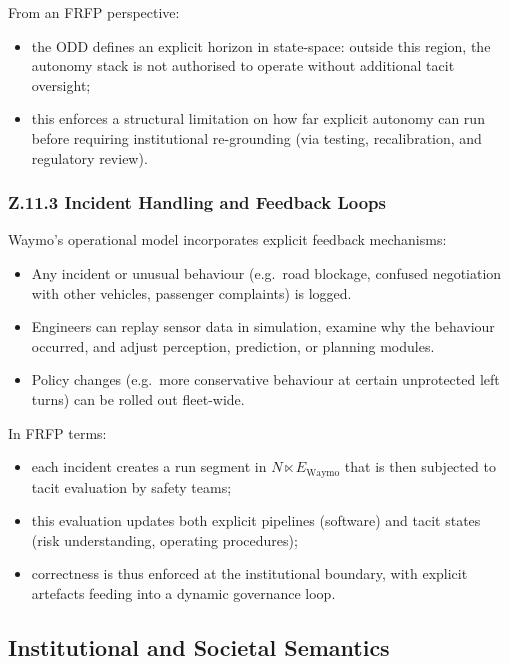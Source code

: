 From an FRFP perspective:

\begin{itemize}
  \item the ODD defines an explicit horizon in state-space:
        outside this region, the autonomy stack is not authorised to
        operate without additional tacit oversight;
  \item this enforces a structural limitation on how far explicit autonomy
        can run before requiring institutional re-grounding (via testing,
        recalibration, and regulatory review).
\end{itemize}

\subsubsection*{Z.11.3 Incident Handling and Feedback Loops}

Waymo’s operational model incorporates explicit feedback mechanisms:

\begin{itemize}
  \item Any incident or unusual behaviour (e.g.\ road blockage, confused
        negotiation with other vehicles, passenger complaints) is logged.
  \item Engineers can replay sensor data in simulation, examine why the
        behaviour occurred, and adjust perception, prediction, or planning
        modules.
  \item Policy changes (e.g.\ more conservative behaviour at certain
        unprotected left turns) can be rolled out fleet-wide.
\end{itemize}

In FRFP terms:

\begin{itemize}
  \item each incident creates a run segment in \(N \ltimes E_{\mathrm{Waymo}}\)
        that is then subjected to tacit evaluation by safety teams;
  \item this evaluation updates both explicit pipelines (software) and
        tacit states (risk understanding, operating procedures);
  \item correctness is thus enforced at the institutional boundary, with
        explicit artefacts feeding into a dynamic governance loop.
\end{itemize}

\subsection{Institutional and Societal Semantics}

